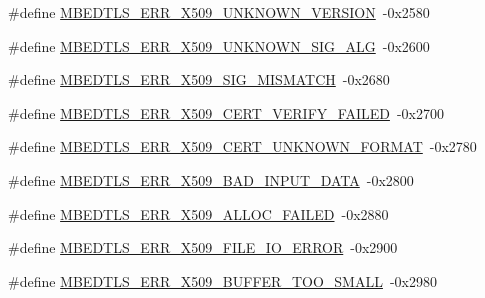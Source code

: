 \begin{DoxyCompactItemize}
\#define \hyperlink{group__x509__module_gab80a4eb806328731def21ec2ebcbc365}{M\-B\-E\-D\-T\-L\-S\-\_\-\-E\-R\-R\-\_\-\-X509\-\_\-\-U\-N\-K\-N\-O\-W\-N\-\_\-\-V\-E\-R\-S\-I\-O\-N}~-\/0x2580
\item 
\#define \hyperlink{group__x509__module_ga488f8616b42eae6fe3fb9815d43c976f}{M\-B\-E\-D\-T\-L\-S\-\_\-\-E\-R\-R\-\_\-\-X509\-\_\-\-U\-N\-K\-N\-O\-W\-N\-\_\-\-S\-I\-G\-\_\-\-A\-L\-G}~-\/0x2600
\item 
\#define \hyperlink{group__x509__module_gac489ce5e8ba417bcd86012ebbb7f5044}{M\-B\-E\-D\-T\-L\-S\-\_\-\-E\-R\-R\-\_\-\-X509\-\_\-\-S\-I\-G\-\_\-\-M\-I\-S\-M\-A\-T\-C\-H}~-\/0x2680
\item 
\#define \hyperlink{group__x509__module_gaba46df0041dcf48fa9d164d28cf3a154}{M\-B\-E\-D\-T\-L\-S\-\_\-\-E\-R\-R\-\_\-\-X509\-\_\-\-C\-E\-R\-T\-\_\-\-V\-E\-R\-I\-F\-Y\-\_\-\-F\-A\-I\-L\-E\-D}~-\/0x2700
\item 
\#define \hyperlink{group__x509__module_gaeb90af9ad906c5075b1ad625ebc26553}{M\-B\-E\-D\-T\-L\-S\-\_\-\-E\-R\-R\-\_\-\-X509\-\_\-\-C\-E\-R\-T\-\_\-\-U\-N\-K\-N\-O\-W\-N\-\_\-\-F\-O\-R\-M\-A\-T}~-\/0x2780
\item 
\#define \hyperlink{group__x509__module_gaeeef11ebf0b31a54a665b1a3fd65c3f7}{M\-B\-E\-D\-T\-L\-S\-\_\-\-E\-R\-R\-\_\-\-X509\-\_\-\-B\-A\-D\-\_\-\-I\-N\-P\-U\-T\-\_\-\-D\-A\-T\-A}~-\/0x2800
\item 
\#define \hyperlink{group__x509__module_gacf6d98c6cbb76728260d1dcb1fe3bc7d}{M\-B\-E\-D\-T\-L\-S\-\_\-\-E\-R\-R\-\_\-\-X509\-\_\-\-A\-L\-L\-O\-C\-\_\-\-F\-A\-I\-L\-E\-D}~-\/0x2880
\item 
\#define \hyperlink{group__x509__module_gad85d9c7aa5c30b9730297bef3386407c}{M\-B\-E\-D\-T\-L\-S\-\_\-\-E\-R\-R\-\_\-\-X509\-\_\-\-F\-I\-L\-E\-\_\-\-I\-O\-\_\-\-E\-R\-R\-O\-R}~-\/0x2900
\item 
\#define \hyperlink{group__x509__module_gab9516fc53ff90c547fd77d35c71feec7}{M\-B\-E\-D\-T\-L\-S\-\_\-\-E\-R\-R\-\_\-\-X509\-\_\-\-B\-U\-F\-F\-E\-R\-\_\-\-T\-O\-O\-\_\-\-S\-M\-A\-L\-L}~-\/0x2980
\end{DoxyCompactItemize}
